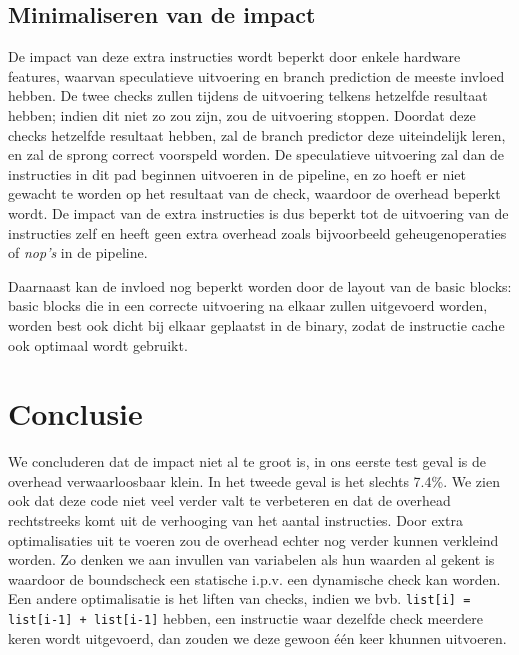 \documentclass{article}
\begin{document}
\subsection{Minimaliseren van de impact}
De impact van deze extra instructies wordt beperkt door enkele hardware features, waarvan speculatieve uitvoering en branch prediction de meeste invloed hebben. De twee checks zullen tijdens de uitvoering telkens hetzelfde resultaat hebben; indien dit niet zo zou zijn, zou de uitvoering stoppen. Doordat deze checks hetzelfde resultaat hebben, zal de branch predictor deze uiteindelijk leren, en zal de sprong correct voorspeld worden. De speculatieve uitvoering zal dan de instructies in dit pad beginnen uitvoeren in de pipeline, en zo hoeft er niet gewacht te worden op het resultaat van de check, waardoor de overhead beperkt wordt. De impact van de extra instructies is dus beperkt tot de uitvoering van de instructies zelf en heeft geen extra overhead zoals bijvoorbeeld geheugenoperaties of \textit{nop's} in de pipeline.
\par
Daarnaast kan de invloed nog beperkt worden door de layout van de basic blocks: basic blocks die in een correcte uitvoering na elkaar zullen uitgevoerd worden, worden best ook dicht bij elkaar geplaatst in de binary, zodat de instructie cache ook optimaal wordt gebruikt.

\section{Conclusie}
We concluderen dat de impact niet al te groot is, in ons eerste test geval is de overhead verwaarloosbaar klein. In het tweede geval is het slechts 7.4\%.
We zien ook dat deze code niet veel verder valt te verbeteren en dat de overhead rechtstreeks komt uit de verhooging van het aantal instructies.
Door extra optimalisaties uit te voeren zou de overhead echter nog verder kunnen verkleind worden. Zo denken we aan invullen van variabelen als hun waarden al gekent is waardoor de boundscheck een statische i.p.v. een dynamische check kan worden.
Een andere optimalisatie is het liften van checks, indien we bvb. \verb!list[i] = list[i-1] + list[i-1]! hebben, een instructie waar dezelfde check meerdere keren wordt uitgevoerd, dan zouden we deze gewoon \'e\'en keer khunnen uitvoeren.
\end{document}
